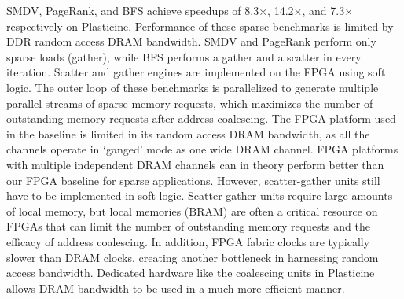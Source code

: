 SMDV, PageRank, and BFS achieve speedups of 8.3$\times$, 14.2$\times$, and 7.3$\times$ respectively on Plasticine. Performance of these sparse benchmarks
is limited by DDR random access DRAM bandwidth. SMDV and PageRank perform only sparse loads (gather), while
BFS performs a gather and a scatter in every iteration. Scatter and gather engines are implemented on the FPGA using soft logic.
The outer loop of these benchmarks is parallelized to generate multiple parallel streams of sparse memory requests,
which maximizes the number of outstanding memory requests after address coalescing.
The FPGA platform used in the baseline is limited in its random access DRAM bandwidth, as all the channels operate in `ganged' mode as one wide DRAM channel.
FPGA platforms with multiple independent DRAM channels can in theory perform better than our FPGA baseline for sparse applications. However, scatter-gather units still have to be implemented
in soft logic. Scatter-gather units require large amounts of local memory, but local memories (BRAM) are often a critical resource on FPGAs that can limit the number of outstanding memory requests
and the efficacy of address coalescing. In addition, FPGA fabric clocks are typically slower than DRAM clocks, creating another bottleneck in harnessing random access bandwidth.
Dedicated hardware like the coalescing units in Plasticine allows DRAM bandwidth to be used in a much more efficient manner.


